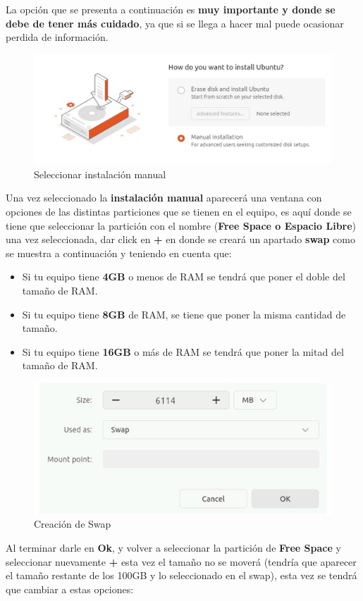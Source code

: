 \documentclass[letter,11pt]{article} %
\begin{document}
\begin{enumerate}
		La opción que se presenta a continuación es \textbf{muy importante y donde se debe de tener más cuidado}, ya que si se llega a hacer mal puede ocasionar perdida de información.
		
		\begin{figure}[H]
			\centering
			\includegraphics[width=0.5\linewidth]{Imagenes/manual_install}
			\caption{Seleccionar instalación manual}
			\label{fig:manualinstall}
		\end{figure}
		
		Una vez seleccionado la \textbf{instalación manual} aparecerá una ventana con opciones de las distintas particiones que se tienen en el equipo, es aquí donde se tiene que seleccionar la partición con el nombre (\textbf{Free Space o Espacio Libre}) una vez seleccionada, dar click en \textbf{+} en donde se creará un apartado \textbf{swap} como se muestra a continuación y teniendo en cuenta que:
		
		\begin{itemize}
			\item Si tu equipo tiene \textbf{4GB} o menos de RAM se tendrá que poner el doble del tamaño de RAM.
			
			\item Si tu equipo tiene \textbf{8GB} de RAM, se tiene que poner la misma cantidad de tamaño.
			
			\item Si tu equipo tiene \textbf{16GB} o más de RAM se tendrá que poner la mitad del tamaño de RAM.
		\end{itemize}
		
		\begin{figure}[H]
			\centering
			\includegraphics[width=0.5\linewidth]{Imagenes/swap}
			\caption{Creación de Swap}
			\label{fig:swap}
		\end{figure}
		
		Al terminar darle en \textbf{Ok}, y volver a seleccionar la partición de \textbf{Free Space} y seleccionar nuevamente \textbf{+} esta vez el tamaño no se moverá (tendría que aparecer el tamaño restante de los 100GB y lo seleccionado en el swap), esta vez se tendrá que cambiar a estas opciones:
		

\end{enumerate}
\end{document}
